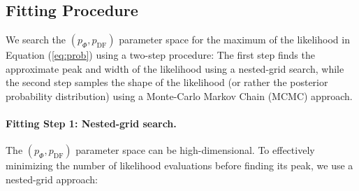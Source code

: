 \subsection{Fitting Procedure} \label{sec:fitting}

We search the $(p_\Phi,p_\text{DF})$ parameter space for the maximum of the likelihood in Equation (\ref{eq:prob}) using a two-step procedure: The first step finds the approximate peak and width of the likelihood using a nested-grid search, while the second step samples the shape of the likelihood (or rather the posterior probability distribution) using a Monte-Carlo Markov Chain (MCMC) approach.

\paragraph{Fitting Step 1: Nested-grid search.} The $(p_\Phi,p_\text{DF})$ parameter space can be high-dimensional. To effectively minimizing the number of likelihood evaluations before finding its peak, we use a nested-grid approach:
